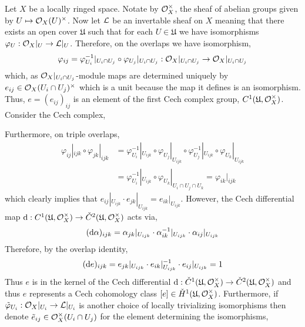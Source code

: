\documentclass[12pt]{article}
\begin{document}
Let $X$ be a locally ringed space. Notate by $\mathcal{O}_{X}^\times$, the sheaf of abelian groups given by $U \mapsto \mathcal{O}_{X}(U)^\times$. Now let $\mathcal{L}$ be an invertable sheaf on $X$ meaning that there exists an open cover $\mathfrak{U}$ such that for each $U \in \mathfrak{U}$ we have isomorphisms $\varphi_U : \mathcal{O}_{X}|_U \to \mathcal{L}|_U$. Therefore, on the overlaps we have isomorphism,
\[ \varphi_{ij} = \varphi_{U_i}^{-1}|_{U_i \cap U_j} \circ \varphi_{U_j} |_{U_i \cap U_j} : \mathcal{O}_{X} |_{U_i \cap U_j} \to \mathcal{O}_{X} |_{U_i \cap U_j} \]
which, as $\mathcal{O}_{X}|_{U_i \cap U_j}$-module maps are determined uniquely by $e_{ij} \in \mathcal{O}_{X}(U_i \cap U_j)^\times$ which is a unit because the map it defines is an isomorphism. Thus, $e = (e_{ij})_{ij}$ is an element of the first Cech complex group, $C^1(\mathfrak{U}, \mathcal{O}_{X}^\times)$. Consider the Cech complex,
\begin{center}
\end{center}
Furthermore, on triple overlaps,
\begin{align*}
\varphi_{ij}|_{ijk} \circ \varphi_{jk}|_{ijk} & = \varphi_{U_i}^{-1}|_{U_{ijk}} \circ \varphi_{U_j} |_{U_{ijk}} \circ \varphi_{U_j}^{-1}|_{U_{ijk}} \circ \varphi_{U_k} |_{U_{ijk}} 
\\
& = \varphi_{U_i}^{-1}|_{U_{ijk}} \circ \varphi_{U_k} |_{U_i \cap U_j \cap U_k} = \varphi_{ik} |_{ijk} 
\end{align*}
which clearly implies that $e_{ij} |_{U_{ijk}} \cdot e_{jk} |_{U_{ijk}} = e_{ik} |_{U_{ijk}}$. However, the Cech differential map $\mathrm{d} : C^1(\mathfrak{U}, \mathcal{O}_{X}^\times) \to \check{C}^2(\mathfrak{U}, \mathcal{O}_{X}^\times)$ acts via,
\[ (\mathrm{d}{\alpha})_{ijk} = \alpha_{jk} |_{U_{ijk}} \cdot \alpha_{ik}^{-1} |_{U_{ijk}} \cdot \alpha_{ij} |_{U_{ijk}} \]
Therefore, by the overlap identity,
\[ (\mathrm{d}{e})_{ijk} = e_{jk}|_{U_{ijk}} \cdot e_{ik}|_{U_{ijk}}^{-1} \cdot e_{ij} |_{U_{ijk}} = 1 \]
Thus $e$ is in the kernel of the Cech differential $\mathrm{d} : \check{C}^1(\mathfrak{U}, \mathcal{O}_{X}^\times) \to \check{C}^2(\mathfrak{U}, \mathcal{O}_{X}^\times)$ and thus $e$ represents a Cech cohomology class $[e] \in \check{H}^1(\mathfrak{U}, \mathcal{O}_{X}^\times)$. Furthermore, if $\tilde{\varphi}_{U_i} : \mathcal{O}_{X} |_{U_i} \to \mathcal{L} |_{U_i}$ is another choice of locally trivializing isomorphisms then denote $\tilde{e}_{ij} \in \mathcal{O}_{X}^\times(U_i \cap U_j)$ for the element determining the isomorphisms,
\end{document}
